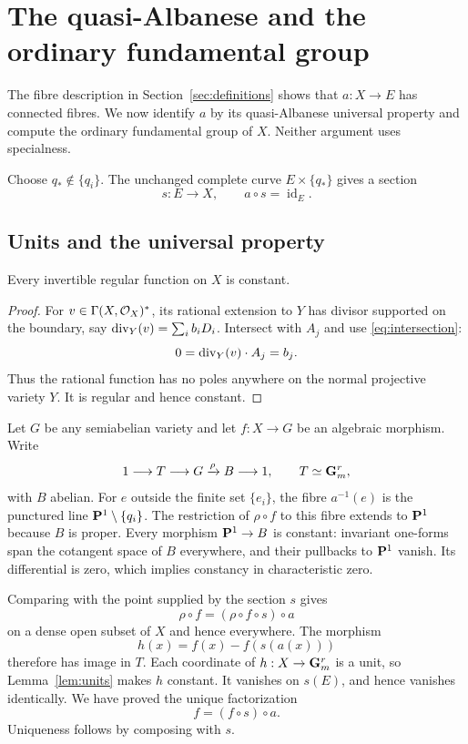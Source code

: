 \section{The quasi-Albanese and the ordinary fundamental group}\label{sec:albanese}

The fibre description in Section~\ref{sec:definitions} shows that
$a:X\to E$ has connected fibres. We now identify $a$ by its
quasi-Albanese universal property and compute the ordinary fundamental
group of $X$. Neither argument uses specialness.

Choose $q_*\notin\{q_i\}$. The unchanged complete curve
$E\times\{q_*\}$ gives a section
\begin{equation}\label{eq:section}
 s:E\longrightarrow X,
 \qquad a\circ s=\operatorname{id}_E.
\end{equation}

\subsection{Units and the universal property}
\begin{lemma}\label{lem:units}
Every invertible regular function on $X$ is constant.
\end{lemma}
\begin{proof}
For $v\in\Gamma(X,\mathcal O_X)^*$, its rational extension to $Y$ has divisor
supported on the boundary, say $\operatorname{div}_Y(v)=\sum_i b_iD_i$. Intersect
with $A_j$ and use \eqref{eq:intersection}:
\[
 0=\operatorname{div}_Y(v)\cdot A_j=b_j.
\]
Thus the rational function has no poles anywhere on the normal
projective variety $Y$. It is regular and hence constant.
\end{proof}

Let $G$ be any semiabelian variety and let $f:X\to G$ be an algebraic
morphism. Write
\[
 1\longrightarrow T\longrightarrow G\xrightarrow{\rho}B
 \longrightarrow1,
 \qquad T\simeq\mathbf G_m^r,
\]
with $B$ abelian. For $e$ outside the finite set $\{e_i\}$, the fibre
$a^{-1}(e)$ is the punctured line $\mathbf P^1\setminus\{q_i\}$. The
restriction of $\rho\circ f$ to this fibre extends to $\mathbf P^1$ because
$B$ is proper. Every morphism $\mathbf P^1\to B$ is constant: invariant
one-forms span the cotangent space of $B$ everywhere, and their pullbacks
to $\mathbf P^1$ vanish. Its differential is zero, which implies constancy in
characteristic zero.

Comparing with the point supplied by the section $s$ gives
\[
 \rho\circ f=(\rho\circ f\circ s)\circ a
\]
on a dense open subset of $X$ and hence everywhere. The morphism
\[
 h(x)=f(x)-f(s(a(x)))
\]
therefore has image in $T$. Each coordinate of $h:X\to\mathbf G_m^r$ is a unit,
so Lemma~\ref{lem:units} makes $h$ constant. It vanishes on $s(E)$, and
hence vanishes identically. We have proved the unique factorization
\begin{equation}\label{eq:universal-factorization}
 f=(f\circ s)\circ a.
\end{equation}
Uniqueness follows by composing with $s$.

